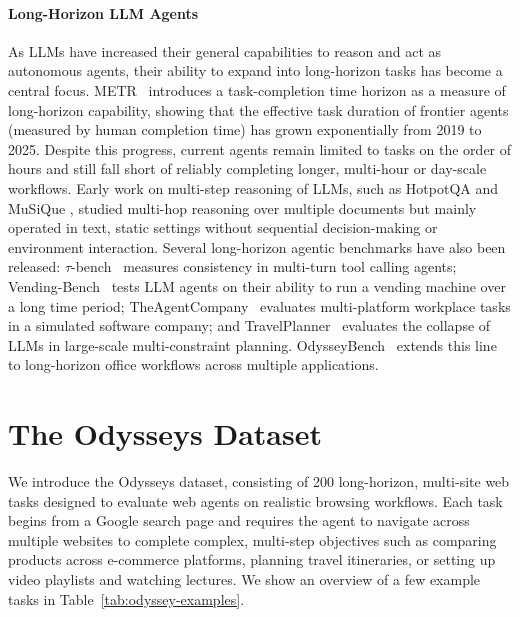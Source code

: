 \documentclass{article}
\theoremstyle{plain}
\theoremstyle{definition}
\theoremstyle{remark}
\def\odysseys{Odysseys\xspace}
\begin{document}
\paragraph{Long-Horizon LLM Agents}
As LLMs have increased their general capabilities to reason and act as autonomous agents, their ability to expand into long-horizon tasks has become a central focus. METR~\citep{kwa2026measuringaiabilitycomplete} introduces a task-completion time horizon as a measure of long-horizon capability, showing that the effective task duration of frontier agents (measured by human completion time) has grown exponentially from 2019 to 2025. Despite this progress, current agents remain limited to tasks on the order of hours and still fall short of reliably completing longer, multi-hour or day-scale workflows.
Early work on multi-step reasoning of LLMs, such as HotpotQA \citep{yang2018hotpotqadatasetdiverseexplainable} and MuSiQue \citep{trivedi2022musiquemultihopquestionssinglehop}, studied multi-hop reasoning over multiple documents but mainly operated in text, static settings without sequential decision-making or environment interaction.
Several long-horizon agentic benchmarks have also been released:
$\tau$-bench~\citep{yao2024taubenchbenchmarktoolagentuserinteraction} measures consistency in multi-turn tool calling agents;
Vending-Bench~\citep{backlund2025vendingbenchbenchmarklongtermcoherence} tests LLM agents on their ability to run a vending machine over a long time period;
TheAgentCompany~\citep{xu2025theagentcompanybenchmarkingllmagents} evaluates multi-platform workplace tasks in a simulated software company;
and TravelPlanner~\citep{xie2024travelplannerbenchmarkrealworldplanning} evaluates the collapse of LLMs in large-scale multi-constraint planning.
OdysseyBench~\citep{wang2025odysseybenchevaluatingllmagents} extends this line to long-horizon office workflows across multiple applications.

\section{The Odysseys Dataset}



We introduce the \odysseys dataset, consisting of 200 long-horizon, multi-site web tasks designed to evaluate web agents on realistic browsing workflows. Each task begins from a Google search page and requires the agent to navigate across multiple websites to complete complex, multi-step objectives such as comparing products across e-commerce platforms, planning travel itineraries, or setting up video playlists and watching lectures. We show an overview of a few example tasks in Table~\ref{tab:odyssey-examples}.
\end{document}
